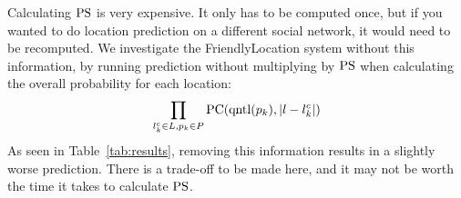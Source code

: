 Calculating $\operatorname{PS}$ is very expensive.
%
It only has to be computed once, but if you wanted to do location prediction on
a different social network, it would need to be recomputed.
%
We investigate the FriendlyLocation system without this information, by running
prediction without multiplying by $\operatorname{PS}$ when calculating the overall
probability for each location:
\[
    \prod_{l^c_k \in L,p_k \in P} \operatorname{PC}(\operatorname{qntl}(p_k),|l-l^c_k|)
\]
As seen in Table~\ref{tab:results}, removing this information results in a
slightly worse prediction.
%
There is a trade-off to be made here, and it may not be worth the time it takes
to calculate $\operatorname{PS}$.



